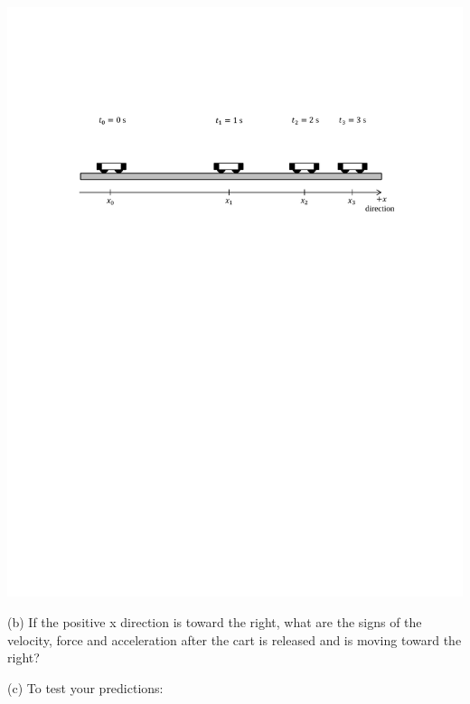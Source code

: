 \vspace{0.3cm}
{\par\centering \includegraphics{force2/carts_slowing.pdf} \par}
\vspace{0.3cm}

(b) If the positive x direction is toward the right, what are the signs of the
velocity, force and acceleration after the cart is released and is moving toward
the right?
\vspace{10mm}

(c) To test your predictions: 

